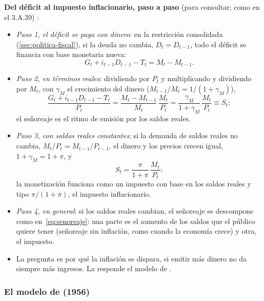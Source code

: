 \documentclass[11pt]{article}
\begin{document}
\begin{anotaciones}
\textbf{Del déficit al impuesto inflacionario, paso a paso} (para consultar; como en el 3.A.39) :
\begin{itemize}
\item \emph{Paso 1, el déficit se paga con dinero}: en la restricción consolidada (\ref{sec:politica-fiscal}), si la deuda no cambia, $D_t=D_{t-1}$, todo el déficit se financia con base monetaria nueva:
  \begin{equation*}
  G_t+i_{t-1}D_{t-1}-T_t=M_t-M_{t-1}.
  \end{equation*}
\item \emph{Paso 2, en términos reales}: dividiendo por $P_t$ y multiplicando y dividiendo por $M_t$, con $\gamma_M$ el crecimiento del dinero ($M_{t-1}/M_t=1/(1+\gamma_M)$),
  \begin{equation*}
  \frac{G_t+i_{t-1}D_{t-1}-T_t}{P_t}=\frac{M_t-M_{t-1}}{M_t}\,\frac{M_t}{P_t}=\frac{\gamma_M}{1+\gamma_M}\,\frac{M_t}{P_t}\equiv S_t :
  \end{equation*}
  el señoreaje es el ritmo de emisión por los saldos reales.
\item \emph{Paso 3, con saldos reales constantes}: si la demanda de saldos reales no cambia, $M_t/P_t=M_{t-1}/P_{t-1}$, el dinero y los precios crecen igual, $1+\gamma_M=1+\pi$, y
  \begin{equation*}
  S_t=\frac{\pi}{1+\pi}\,\frac{M_t}{P_t}:
  \end{equation*}
  la monetización funciona como un impuesto con base en los saldos reales y tipo $\pi/(1+\pi)$, el impuesto inflacionario.
\item \emph{Paso 4, en general}: si los saldos reales cambian, el señoreaje se descompone como en~\eqref{eq:senoreaje}: una parte es el aumento de los saldos que el público quiere tener (señoreaje sin inflación, como cuando la economía crece) y otra, el impuesto.
\end{itemize}
\end{anotaciones}

\begin{itemize}
\item La pregunta es por qué la inflación se dispara, si emitir más dinero no da siempre más ingresos. La responde el modelo de .
\end{itemize}

\subsubsection{El modelo de  (1956)}\label{sec:cagan}
\end{document}
